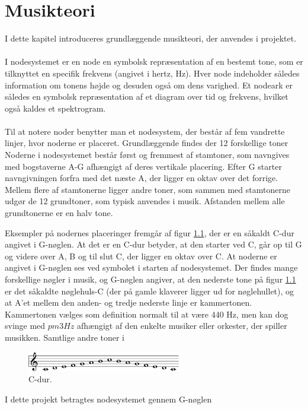 \chapter{Musikteori}
I dette kapitel introduceres grundlæggende musikteori, der anvendes i projektet.
\\ \\
I nodesystemet er en node en symbolsk repræsentation af en bestemt tone, som er tilknyttet en specifik frekvens (angivet i hertz, Hz). Hver node indeholder således information om tonens højde og desuden også om dens varighed. Et nodeark er således en symbolsk repræsentation af et diagram over tid og frekvens, hvilket også kaldes et spektrogram.
\\ \\
Til at notere noder benytter man et nodesystem, der består af fem vandrette linjer, hvor noderne er placeret. Grundlæggende findes der 12 forskellige toner Noderne i nodesystemet består først og fremmest af stamtoner, som navngives med bogstaverne A-G afhængigt af deres vertikale placering. Efter G starter navngivningen forfra med det næste A, der ligger en oktav over det forrige. Mellem flere af stamtonerne ligger andre toner, som sammen med stamtonerne udgør de 12 grundtoner, som typisk anvendes i musik. Afstanden mellem alle grundtonerne er en halv tone.

Eksempler på nodernes placeringer fremgår af figur \ref{Cdur}, der er en såkaldt C-dur angivet i G-nøglen. At det er en C-dur betyder, at den starter ved C, går op til G og videre over A, B og til slut C, der ligger en oktav over C. At noderne er angivet i G-nøglen ses ved symbolet i starten af nodesystemet. Der findes mange forskellige nøgler i musik, og G-nøglen angiver, at den nederste tone på figur \ref{Cdur} er det såkaldte nøglehuls-C (der på gamle klaverer ligger ud for nøglehullet), og at A'et mellem den anden- og tredje nederste linje er kammertonen. Kammertonen vælges som definition normalt til at være 440 Hz, men kan dog svinge med $pm 3 Hz$ afhængigt af den enkelte musiker eller orkester, der spiller musikken. Samtlige andre toner i 

\begin{figure}[H]
    \centering
    \includegraphics[width = 0.6\textwidth]{figures/C_dur.PNG}
    \caption{C-dur.}
    \label{Cdur}
\end{figure}

I dette projekt betragtes nodesystemet gennem G-nøglen